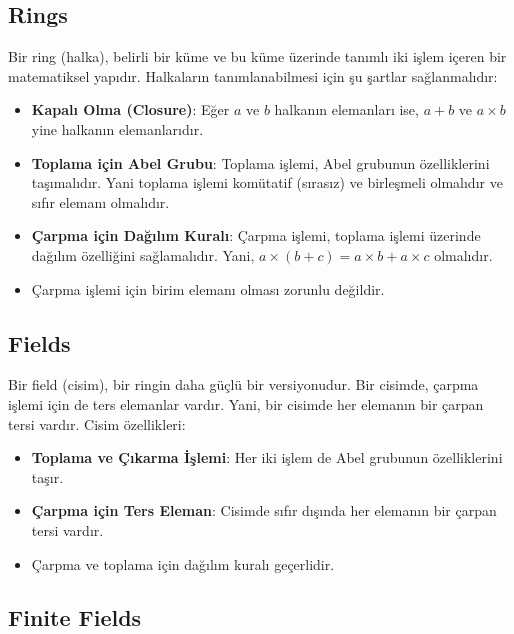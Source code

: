 \newpage

\subsection{Rings}

Bir ring (halka), belirli bir küme ve bu küme üzerinde tanımlı iki işlem içeren bir matematiksel yapıdır. Halkaların tanımlanabilmesi için şu şartlar sağlanmalıdır:

\begin{itemize}
    \item \textbf{Kapalı Olma (Closure)}: Eğer $a$ ve $b$ halkanın elemanları ise, $a + b$ ve $a \times b$ yine halkanın elemanlarıdır.
    \item \textbf{Toplama için Abel Grubu}: Toplama işlemi, Abel grubunun özelliklerini taşımalıdır. Yani toplama işlemi komütatif (sırasız) ve birleşmeli olmalıdır ve sıfır elemanı olmalıdır.
    \item \textbf{Çarpma için Dağılım Kuralı}: Çarpma işlemi, toplama işlemi üzerinde dağılım özelliğini sağlamalıdır. Yani, $a \times (b + c) = a \times b + a \times c$ olmalıdır.
    \item Çarpma işlemi için birim elemanı olması zorunlu değildir.
\end{itemize}

\newpage

\subsection{Fields}

Bir field (cisim), bir ringin daha güçlü bir versiyonudur. Bir cisimde, çarpma işlemi için de ters elemanlar vardır. Yani, bir cisimde her elemanın bir çarpan tersi vardır. Cisim özellikleri:

\begin{itemize}
    \item \textbf{Toplama ve Çıkarma İşlemi}: Her iki işlem de Abel grubunun özelliklerini taşır.
    \item \textbf{Çarpma için Ters Eleman}: Cisimde sıfır dışında her elemanın bir çarpan tersi vardır.
    \item Çarpma ve toplama için dağılım kuralı geçerlidir.
\end{itemize}

\newpage

\subsection{Finite Fields}

